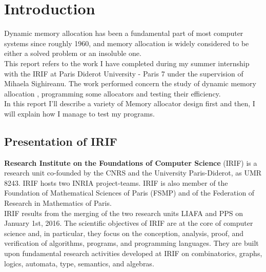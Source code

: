 \section{Introduction}
Dynamic memory allocation has been a fundamental part of most computer systems since roughly 1960, and memory allocation is widely considered to be either a solved problem or an insoluble one.\\

This report refers to the work I have completed during my summer internship with the IRIF at  Paris Diderot University - Paris 7 under the supervision of Mihaela Sighireanu. The work performed concern the study  of dynamic memory allocation , programming some allocators and testing their efficiency.\\

 In this report I'll describe a variety of Memory allocator design first and then, I will explain how I manage to test my programs.





\subsection{Presentation of IRIF}
\textbf{Research Institute on the Foundations of Computer Science }
(IRIF) is a research unit co-founded by the CNRS and the University Paris-Diderot, as UMR 8243. IRIF hosts two INRIA project-teams. IRIF is also member of the Foundation of Mathematical Sciences of Paris (FSMP) and of the Federation of Research in Mathematics of Paris. \\

IRIF results from the merging of the two research units LIAFA and PPS on January 1st, 2016. The scientific objectives of IRIF are at the core of computer science and, in particular, they focus on the conception, analysis, proof, and verification of algorithms, programs, and programming languages. They are built upon fundamental research activities developed at IRIF on combinatorics, graphs, logics, automata, type, semantics, and algebras.\\

